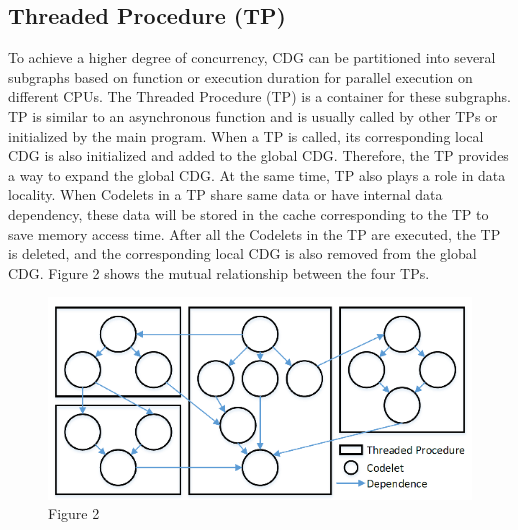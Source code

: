 \subsection*{Threaded Procedure (TP)}
To achieve a higher degree of concurrency, CDG can be partitioned into several subgraphs based on function or execution duration for parallel execution on different CPUs. The Threaded Procedure (TP) is a container for these subgraphs. TP is similar to an asynchronous function and is usually called by other TPs or initialized by the main program. When a TP is called, its corresponding local CDG is also initialized and added to the global CDG. Therefore, the TP provides a way to expand the global CDG. At the same time, TP also plays a role in data locality. When Codelets in a TP share same data or have internal data dependency, these data will be stored in the cache corresponding to the TP to save memory access time. After all the Codelets in the TP are executed, the TP is deleted, and the corresponding local CDG is also removed from the global CDG. Figure 2 shows the mutual relationship between the four TPs.


\begin{figure}[h]
\caption{Figure 2}
\centering
\includegraphics[]{Fig/figure2.png}
\end{figure}


